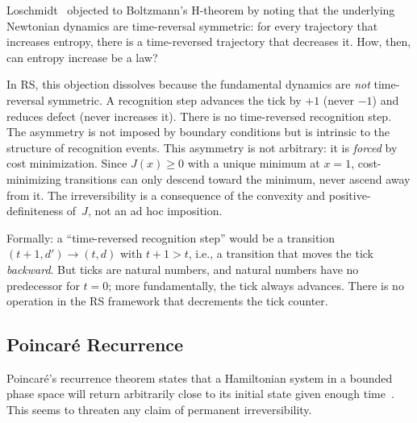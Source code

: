 \documentclass[12pt,a4paper]{article}
\theoremstyle{definition}
\theoremstyle{remark}
\begin{document}
Loschmidt~\cite{Loschmidt1876} objected to Boltzmann's H-theorem by
noting that the underlying Newtonian dynamics are time-reversal
symmetric: for every trajectory that increases entropy, there is a
time-reversed trajectory that decreases it.  How, then, can entropy
increase be a law?

In RS, this objection dissolves because the fundamental dynamics are
\emph{not} time-reversal symmetric.  A recognition step advances the
tick by $+1$ (never $-1$) and reduces defect (never increases it).
There is no time-reversed recognition step.  The asymmetry is not
imposed by boundary conditions but is intrinsic to the structure of
recognition events.  This asymmetry is not arbitrary: it is
\emph{forced} by cost minimization.  Since $J(x) \geq 0$ with a unique
minimum at $x = 1$, cost-minimizing transitions can only descend
toward the minimum, never ascend away from it.  The irreversibility is
a consequence of the convexity and positive-definiteness of~$J$, not an
ad hoc imposition.

Formally: a ``time-reversed recognition step'' would be a transition
$(t{+}1, d') \to (t, d)$ with $t{+}1 > t$, i.e., a transition that
moves the tick \emph{backward}.  But ticks are natural numbers, and
natural numbers have no predecessor for $t = 0$; more fundamentally,
the tick always advances.  There is no operation in the RS framework
that decrements the tick counter.

\subsection{Poincar\'e Recurrence}

Poincar\'e's recurrence theorem states that a Hamiltonian system in a
bounded phase space will return arbitrarily close to its initial state
given enough time~\cite{Penrose2004}.  This seems to threaten any claim
of permanent irreversibility.
\end{document}
